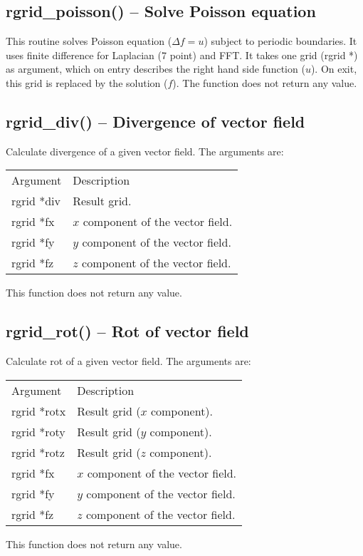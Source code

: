 \documentclass[12pt,letterpaper]{report}
\begin{document}
\subsection{rgrid\_poisson() -- Solve Poisson equation}

This routine solves Poisson equation ($\Delta f = u$) subject to periodic boundaries. It
uses finite difference for Laplacian (7 point) and FFT. It takes one grid (rgrid *) as argument, which on entry describes the right hand side function ($u$). On exit, this grid is replaced by the solution ($f$). The function does not return any value.

\subsection{rgrid\_div() -- Divergence of vector field}

Calculate divergence of a given vector field. The arguments are:
\begin{longtable}{p{} p{}}
Argument & Description\\
\cline{1-2}
rgrid *div & Result grid.\\
rgrid *fx  & $x$ component of the vector field.\\
rgrid *fy  & $y$ component of the vector field.\\
rgrid *fz  & $z$ component of the vector field.\\
\end{longtable}
\noindent
This function does not return any value. 

\subsection{rgrid\_rot() -- Rot of vector field}

Calculate rot of a given vector field. The arguments are:
\begin{longtable}{p{} p{}}
Argument & Description\\
\cline{1-2}
rgrid *rotx & Result grid ($x$ component).\\
rgrid *roty & Result grid ($y$ component).\\
rgrid *rotz & Result grid ($z$ component).\\
rgrid *fx  & $x$ component of the vector field.\\
rgrid *fy  & $y$ component of the vector field.\\
rgrid *fz  & $z$ component of the vector field.\\
\end{longtable}
\noindent
This function does not return any value. 
\end{document}
